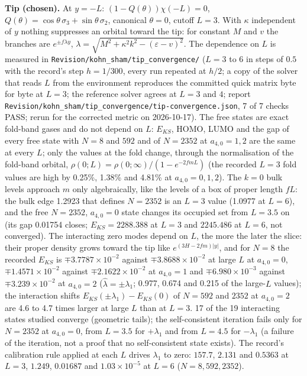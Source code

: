 \documentclass[11pt]{article}
\begin{document}
\textbf{Tip (chosen).} At $y = -L$: $(1 - Q(\theta))\chi(-L) = 0$, $Q(\theta) = \cos\theta\,\sigma_3 + \sin\theta\,\sigma_2$, canonical $\theta = 0$, cutoff $L = 3$. With $\kappa$ independent of $y$ nothing suppresses an orbital toward the tip: for constant $M$ and $v$ the branches are $e^{\pm f\lambda y}$, $\lambda = \sqrt{M^2 + \kappa^2k^2 - (\varepsilon - v)^2}$. The dependence on $L$ is measured in \texttt{Revision\allowbreak{}/kohn\_sh\allowbreak{}am/tip\_c\allowbreak{}onvergen\allowbreak{}ce/} ($L = 3$ to $6$ in steps of $0.5$ with the record's step $h = 1/300$, every run repeated at $h/2$; a copy of the solver that reads $L$ from the environment reproduces the committed quick matrix byte for byte at $L = 3$; the reference solver agrees at $L = 3$ and $4$; report \texttt{Revision\allowbreak{}/kohn\_sh\allowbreak{}am/tip\_c\allowbreak{}onvergen\allowbreak{}ce/tip-c\allowbreak{}onvergen\allowbreak{}ce.json}, 7 of 7 checks PASS; rerun for the corrected metric on 2026-10-17). The free states are exact fold-band gases and do not depend on $L$: $E_{KS}$, HOMO, LUMO and the gap of every free state with $N = 8$ and $592$ and of $N = 2352$ at $a_{4,0} = 1, 2$ are the same at every $L$; only the values at the fold change, through the normalisation of the fold-band orbital, $\rho(0; L) = \rho(0; \infty)/(1 - e^{-2fmL})$ (the recorded $L = 3$ fold values are high by 0.25\%, 1.38\% and 4.81\% at $a_{4,0} = 0, 1, 2$). The $k = 0$ bulk levels approach $m$ only algebraically, like the levels of a box of proper length $fL$: the bulk edge 1.2923 that defines $N = 2352$ is an $L = 3$ value (1.0977 at $L = 6$), and the free $N = 2352$, $a_{4,0} = 0$ state changes its occupied set from $L = 3.5$ on (its gap 0.01754 closes; $E_{KS} = 2288.388$ at $L = 3$ and $2245.486$ at $L = 6$, not converged). The interacting zero modes depend on $L$, the more the later the slice: their proper density grows toward the tip like $e^{(3H - 2fm)|y|}$, and for $N = 8$ the recorded $E_{KS}$ is $\mp 3.7787\times10^{-2}$ against $\mp 3.8688\times10^{-2}$ at large $L$ at $a_{4,0} = 0$, $\mp 1.4571\times10^{-2}$ against $\mp 2.1622\times10^{-2}$ at $a_{4,0} = 1$ and $\mp 6.980\times10^{-3}$ against $\mp 3.239\times10^{-2}$ at $a_{4,0} = 2$ ($\hat\lambda = \pm\lambda_1$; 0.977, 0.674 and 0.215 of the large-$L$ values); the interaction shifts $E_{KS}(\pm\lambda_1) - E_{KS}(0)$ of $N = 592$ and $2352$ at $a_{4,0} = 2$ are 4.6 to 4.7 times larger at large $L$ than at $L = 3$. 17 of the 19 interacting states studied converge (geometric tails); the self-consistent iteration fails only for $N = 2352$ at $a_{4,0} = 0$, from $L = 3.5$ for $+\lambda_1$ and from $L = 4.5$ for $-\lambda_1$ (a failure of the iteration, not a proof that no self-consistent state exists). The record's calibration rule applied at each $L$ drives $\lambda_1$ to zero: $157.7$, $2.131$ and $0.5363$ at $L = 3$, $1.249$, $0.01687$ and $1.03\times10^{-5}$ at $L = 6$ ($N = 8, 592, 2352$).
\end{document}
